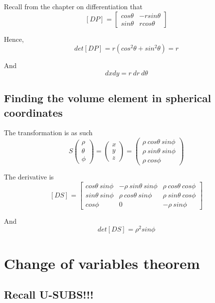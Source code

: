 Recall from the chapter on differentiation that 
\[
  \left[ D P \right]_{}  = \begin{bmatrix} 
     cos \theta & -r sin \theta \\ sin \theta & rcos \theta  
  \end{bmatrix}
\] 

Hence, 
\[
  det \left[ D P \right]_{}  = r \left( cos^2 \theta + sin^2 \theta \right)  = r
\] 

And
\[
  dx dy = r\ dr\ d \theta
\] 

\subsection{Finding the volume element in spherical coordinates}

The transformation is as such
\[
  S \begin{pmatrix} \rho \\ \theta \\ \phi \end{pmatrix}  = \begin{pmatrix} x \\ y \\ z \end{pmatrix}  = \begin{pmatrix} 
  \rho\ cos \theta\ sin \phi \\
  \rho\ sin \theta\ sin \phi \\
  \rho\ cos  \phi 
\end{pmatrix} 
\] 

The derivative is 
\[
  \left[ D S \right]_{}  = \begin{bmatrix} 
     cos \theta\ sin \phi & -\rho\ sin \theta\ sin \phi & \rho\ cos \theta\ cos \phi \\  
     sin \theta\ sin \phi & \rho\ cos \theta\ sin \phi & \rho\ sin \theta\ cos \phi \\  
     cos \phi  & 0 & - \rho\ sin \phi
  \end{bmatrix}
\] 

And 
\[
  det \left[ D S \right]_{}  = \rho ^2 sin \phi
\] 

\section{Change of variables theorem}

\subsection{Recall U-SUBS!!!}


